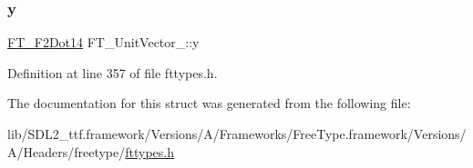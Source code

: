 \subsubsection{\texorpdfstring{y}{y}}
{\footnotesize\ttfamily \mbox{\hyperlink{fttypes_8h_a430d070e946e531a607ae350e822ffca}{F\+T\+\_\+\+F2\+Dot14}} F\+T\+\_\+\+Unit\+Vector\+\_\+\+::y}



Definition at line 357 of file fttypes.\+h.



The documentation for this struct was generated from the following file\+:\begin{DoxyCompactItemize}
\item 
lib/\+S\+D\+L2\+\_\+ttf.\+framework/\+Versions/\+A/\+Frameworks/\+Free\+Type.\+framework/\+Versions/\+A/\+Headers/freetype/\mbox{\hyperlink{fttypes_8h}{fttypes.\+h}}\end{DoxyCompactItemize}
